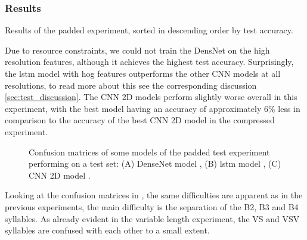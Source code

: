 \subsubsection{Results}
\begin{table}[ht!]
\hspace{-1cm}

\caption{Results of the padded experiment, sorted in descending order by test accuracy.}
\label{tab:result_overview_sct_padded}
\end{table}
Due to resource constraints, we could not train the DensNet on the high resolution features, although it achieves the highest test accuracy. Surprisingly, the \gls{lstm} model with \gls{hog} features outperforms the other CNN models at all resolutions, to read more about this see the corresponding discussion \ref{sec:test_discussion}.
The CNN 2D models perform slightly worse overall in this experiment, with the best model \cite{nn_cnn_2d_sct_left_padded_nrs6xpps5000h512_raw_100} having an accuracy of approximately 6\% less in comparison to the accuracy of the best CNN 2D model \cite{nn_cnn_2d_sct_compressed_nrs0_raw_100} in the compressed experiment.

\begin{figure}[!htb]
  \centering
  \caption{Confusion matrices of some models of the padded test experiment performing on a test set: (A) DenseNet model \cite{nn_densNet_sct_left_padded_nrs0xpps2000h256_raw_100}, (B) \gls{lstm} model \cite{nn_lstm_sct_left_padded_nrs0xpps5000h512_hog_100}, (C) CNN 2D model \cite{nn_cnn_2d_sct_left_padded_nrs6xpps5000h512_raw_100}.}
  \label{fig:confusion_sct_padded}
\end{figure}

Looking at the confusion matrices in , the same difficulties are apparent as in the previous experiments, the main difficulty is the separation of the B2, B3 and B4 syllables. As already evident in the variable length experiment, the VS and VSV syllables are confused with each other to a small extent.


